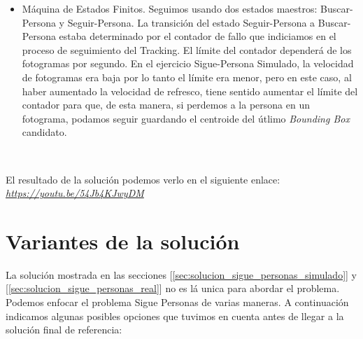 \begin{itemize}
	\item Máquina de Estados Finitos. Seguimos usando dos estados maestros: Buscar-Persona y Seguir-Persona. La transición del estado Seguir-Persona a Buscar-Persona estaba determinado por el contador de fallo que indiciamos en el proceso de seguimiento del Tracking. El límite del contador dependerá de los fotogramas por segundo. En el ejercicio Sigue-Persona Simulado, la velocidad de fotogramas era baja por lo tanto el límite era menor, pero en este caso, al haber aumentado la velocidad de refresco, tiene sentido aumentar el límite del contador para que, de esta manera, si perdemos a la persona en un fotograma, podamos seguir guardando el centroide del útlimo \textit{Bounding Box} candidato.
\end{itemize}\

El resultado de la solución podemos verlo en el siguiente enlace:\\
\textit{\url{https://youtu.be/54Jb4KJwyDM}}\\



\section{Variantes de la solución}
\label{sec:variantes_solucion}

La solución mostrada en las secciones [\ref{sec:solucion_sigue_personas_simulado}] y [\ref{sec:solucion_sigue_personas_real}] no es lá unica para abordar el problema. Podemos enfocar el problema Sigue Personas de varias maneras. A continuación indicamos algunas posibles opciones que tuvimos en cuenta antes de llegar a la solución final de referencia:\\


